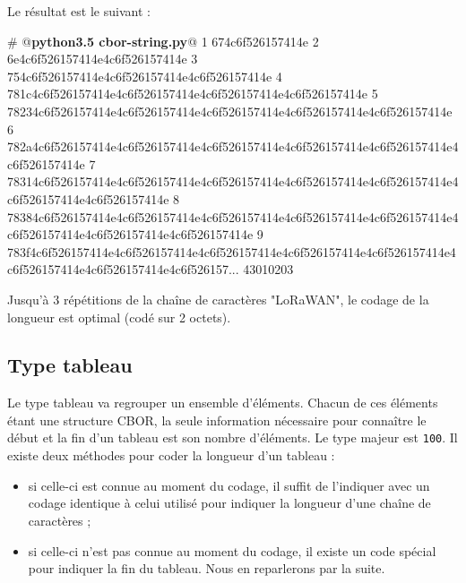        \vspace{1em}

 
Le résultat est le suivant :

\begin{termc}[backgroundcolor=\color{palerod}, language=json, basicstyle=\ttfamily\tiny, escapechar=@]
# @\textbf{python3.5 cbor-string.py}@
  1 674c6f526157414e
  2 6e4c6f526157414e4c6f526157414e
  3 754c6f526157414e4c6f526157414e4c6f526157414e
  4 781c4c6f526157414e4c6f526157414e4c6f526157414e4c6f526157414e
  5 78234c6f526157414e4c6f526157414e4c6f526157414e4c6f526157414e4c6f526157414e
  6 782a4c6f526157414e4c6f526157414e4c6f526157414e4c6f526157414e4c6f526157414e4c6f526157414e
  7 78314c6f526157414e4c6f526157414e4c6f526157414e4c6f526157414e4c6f526157414e4c6f526157414e4c6f526157414e
  8 78384c6f526157414e4c6f526157414e4c6f526157414e4c6f526157414e4c6f526157414e4c6f526157414e4c6f526157414e4c6f526157414e
  9 783f4c6f526157414e4c6f526157414e4c6f526157414e4c6f526157414e4c6f526157414e4c6f526157414e4c6f526157414e4c6f526157...
43010203
\end{termc}


Jusqu'à 3 répétitions de la chaîne de caractères "LoRaWAN", le codage de la longueur est optimal (codé sur 2 octets).

\subsection{Type tableau}

Le type tableau va regrouper un ensemble d'éléments. Chacun de ces éléments étant une structure CBOR, la seule information nécessaire pour connaître le début et la fin d'un tableau est son nombre d'éléments. Le type majeur est \texttt{100}. Il existe deux méthodes pour coder la longueur d'un tableau :
\begin{itemize}
    \item si celle-ci est connue au moment du codage, il suffit de l'indiquer avec un codage identique à celui utilisé pour indiquer la longueur d'une chaîne de caractères ;
    \item si celle-ci n'est pas connue au moment du codage, il existe un code spécial pour indiquer la fin du tableau. Nous en reparlerons par la suite.
\end{itemize}


